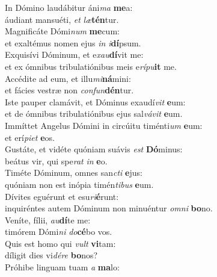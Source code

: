 \evenverse In Dómino laudábitur áni\textit{ma} \textbf{me}a:~\*\\
\evenverse áudiant mansuéti, \textit{et} \textit{læ}\textbf{tén}tur.\\
\oddverse Magnificáte Dómi\textit{num} \textbf{me}cum:~\*\\
\oddverse et exaltémus nomen ejus \textit{in} \textit{i}\textbf{dí}psum.\\
\evenverse Exquisívi Dóminum, et e\textit{xau}\textbf{dí}vit me:~\*\\
\evenverse et ex ómnibus tribulatiónibus meis e\textit{rí}\textit{pu}\textbf{it} me.\\
\oddverse Accédite ad eum, et illu\textit{mi}\textbf{ná}mini:~\*\\
\oddverse et fácies vestræ non \textit{con}\textit{fun}\textbf{dén}tur.\\
\evenverse Iste pauper clamávit, et Dóminus exaudí\textit{vit} \textbf{e}um:~\*\\
\evenverse et de ómnibus tribulatiónibus ejus sal\textit{vá}\textit{vit} \textbf{e}um.\\
\oddverse Immíttet Angelus Dómini in circúitu timénti\textit{um} \textbf{e}um:~\*\\
\oddverse et erí\textit{pi}\textit{et} \textbf{e}os.\\
\evenverse Gustáte, et vidéte quóniam suávis \textit{est} \textbf{Dó}minus:~\*\\
\evenverse beátus vir, qui spe\textit{rat} \textit{in} \textbf{e}o.\\
\oddverse Timéte Dóminum, omnes san\textit{cti} \textbf{e}jus:~\*\\
\oddverse quóniam non est inópia timén\textit{ti}\textit{bus} \textbf{e}um.\\
\evenverse Dívites eguérunt et esu\textit{ri}\textbf{é}runt:~\*\\
\evenverse inquiréntes autem Dóminum non minuéntur \textit{om}\textit{ni} \textbf{bo}no.\\
\oddverse Veníte, fílii, \textit{au}\textbf{dí}te me:~\*\\
\oddverse timórem Dómi\textit{ni} \textit{do}\textbf{cé}bo vos.\\
\evenverse Quis est homo qui \textit{vult} \textbf{vi}tam:~\*\\
\evenverse díligit dies vi\textit{dé}\textit{re} \textbf{bo}nos?\\
\oddverse Próhibe linguam tuam \textit{a} \textbf{ma}lo:~\*\\
